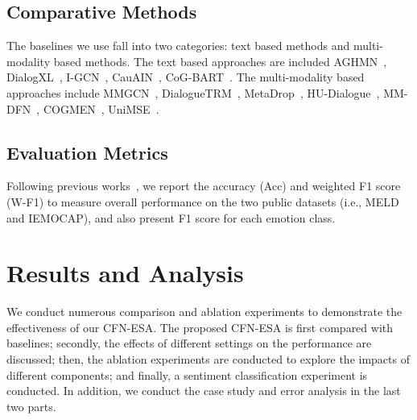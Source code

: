\documentclass[journal]{IEEEtran}
\begin{document}
\subsection{Comparative Methods}
The baselines we use fall into two categories: text based methods and multi-modality based methods. The text based approaches are included AGHMN~\cite{jiao2020real}, DialogXL~\cite{shen2021dialogxl}, I-GCN~\cite{nie2022igcn}, CauAIN~\cite{zhao2022cauain}, CoG-BART~\cite{li2022contrast}. The multi-modality based approaches include MMGCN~\cite{hu2021mmgcn}, DialogueTRM~\cite{mao2021dialoguetrm}, MetaDrop~\cite{chen2021learning}, HU-Dialogue~\cite{chen2022modeling}, MM-DFN~\cite{hu2022mmdfn}, COGMEN~\cite{joshi2022cogmen}, UniMSE~\cite{hu2022unimse}.

\subsection{Evaluation Metrics}
Following previous works~\cite{hu2021mmgcn,hu2022mmdfn}, we report the accuracy (Acc) and weighted F1 score (W-F1) to measure overall performance on the two public datasets (i.e., MELD and IEMOCAP), and also present F1 score for each emotion class.

\section{Results and Analysis}\label{result}
We conduct numerous comparison and ablation experiments to demonstrate the effectiveness of our CFN-ESA. The proposed CFN-ESA is first compared with baselines; secondly, the effects of different settings on the performance are discussed; then, the ablation experiments are conducted to explore the impacts of different components; and finally, a sentiment classification experiment is conducted. In addition, we conduct the case study and error analysis in the last two parts.
\end{document}
